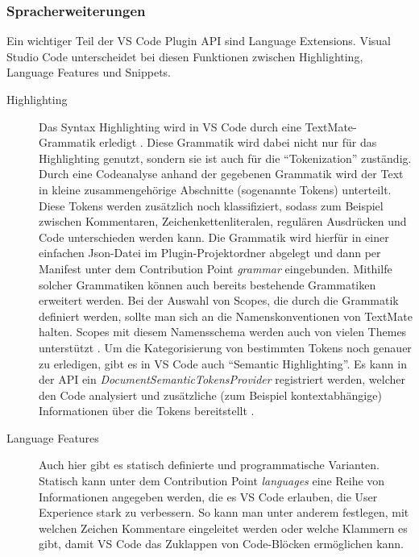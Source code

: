 \subsubsection{Spracherweiterungen}
  Ein wichtiger Teil der VS Code Plugin API sind Language Extensions. Visual Studio Code unterscheidet
  bei diesen Funktionen zwischen Highlighting, Language Features und Snippets.
  \begin{description}
    \item[Highlighting] 
      Das Syntax Highlighting wird in VS Code durch eine TextMate-\linebreak
      Grammatik erledigt \cite{TextMateGrammar}.
      Diese Grammatik wird dabei nicht nur für das Highlighting genutzt, sondern sie ist auch für die \enquote{Tokenization}
      zuständig. Durch eine Codeanalyse anhand der gegebenen Grammatik wird der Text in kleine 
      zusammengehörige Abschnitte (sogenannte Tokens) unterteilt. Diese Tokens werden zusätzlich noch 
      klassifiziert, sodass zum Beispiel zwischen Kommentaren, Zeichenkettenliteralen, regulären Ausdrücken und Code unterschieden werden kann.
      Die Grammatik wird hierfür in einer einfachen Json-Datei im Plugin-Projektordner abgelegt und dann per Manifest
      unter dem Contribution Point \emph{grammar} eingebunden. Mithilfe solcher Grammatiken können auch bereits bestehende
      Grammatiken erweitert werden. Bei der Auswahl von Scopes, die durch die Grammatik definiert werden, sollte man sich
      an die Namenskonventionen von TextMate halten. Scopes mit diesem Namensschema werden auch von vielen Themes unterstützt
      \cite{VSCodeExtensionAPISyntaxHighlightGuide}.
      Um die Kategorisierung von bestimmten Tokens noch genauer zu erledigen, gibt es in VS Code auch \enquote{Semantic Highlighting}. 
      Es kann in der API ein \emph{DocumentSemanticTokensProvider} registriert werden,
      welcher den Code analysiert und zusätzliche (zum Beispiel kontextabhängige) Informationen über die Tokens bereitstellt
      \cite{VSCodeExtensionAPISemanticHighlightGuide}.
    \item[Language Features] 
      Auch hier gibt es statisch definierte und programmatische Varianten.
      Statisch kann unter dem Contribution Point \emph{languages} eine Reihe von Informationen angegeben werden,
      die es VS Code erlauben, die User Experience stark zu verbessern. So kann man unter anderem festlegen,
      mit welchen Zeichen Kommentare eingeleitet werden oder welche Klammern es gibt, damit VS Code 
      das Zuklappen von Code-Blöcken ermöglichen kann.

\end{description}

